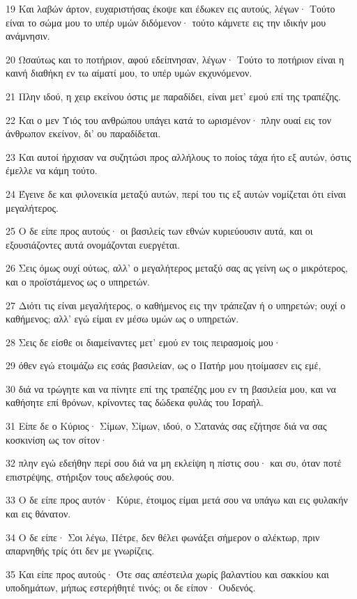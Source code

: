 \par 19 Και λαβών άρτον, ευχαριστήσας έκοψε και έδωκεν εις αυτούς, λέγων· Τούτο είναι το σώμα μου το υπέρ υμών διδόμενον· τούτο κάμνετε εις την ιδικήν μου ανάμνησιν.
\par 20 Ωσαύτως και το ποτήριον, αφού εδείπνησαν, λέγων· Τούτο το ποτήριον είναι η καινή διαθήκη εν τω αίματί μου, το υπέρ υμών εκχυνόμενον.
\par 21 Πλην ιδού, η χειρ εκείνου όστις με παραδίδει, είναι μετ' εμού επί της τραπέζης.
\par 22 Και ο μεν Υιός του ανθρώπου υπάγει κατά το ωρισμένον· πλην ουαί εις τον άνθρωπον εκείνον, δι' ου παραδίδεται.
\par 23 Και αυτοί ήρχισαν να συζητώσι προς αλλήλους το ποίος τάχα ήτο εξ αυτών, όστις έμελλε να κάμη τούτο.
\par 24 Έγεινε δε και φιλονεικία μεταξύ αυτών, περί του τις εξ αυτών νομίζεται ότι είναι μεγαλήτερος.
\par 25 Ο δε είπε προς αυτούς· οι βασιλείς των εθνών κυριεύουσιν αυτά, και οι εξουσιάζοντες αυτά ονομάζονται ευεργέται.
\par 26 Σεις όμως ουχί ούτως, αλλ' ο μεγαλήτερος μεταξύ σας ας γείνη ως ο μικρότερος, και ο προϊστάμενος ως ο υπηρετών.
\par 27 Διότι τις είναι μεγαλήτερος, ο καθήμενος εις την τράπεζαν ή ο υπηρετών; ουχί ο καθήμενος; αλλ' εγώ είμαι εν μέσω υμών ως ο υπηρετών.
\par 28 Σεις δε είσθε οι διαμείναντες μετ' εμού εν τοις πειρασμοίς μου·
\par 29 όθεν εγώ ετοιμάζω εις εσάς βασιλείαν, ως ο Πατήρ μου ητοίμασεν εις εμέ,
\par 30 διά να τρώγητε και να πίνητε επί της τραπέζης μου εν τη βασιλεία μου, και να καθήσητε επί θρόνων, κρίνοντες τας δώδεκα φυλάς του Ισραήλ.
\par 31 Είπε δε ο Κύριος· Σίμων, Σίμων, ιδού, ο Σατανάς σας εζήτησε διά να σας κοσκινίση ως τον σίτον·
\par 32 πλην εγώ εδεήθην περί σου διά να μη εκλείψη η πίστις σου· και συ, όταν ποτέ επιστρέψης, στήριξον τους αδελφούς σου.
\par 33 Ο δε είπε προς αυτόν· Κύριε, έτοιμος είμαι μετά σου να υπάγω και εις φυλακήν και εις θάνατον.
\par 34 Ο δε είπε· Σοι λέγω, Πέτρε, δεν θέλει φωνάξει σήμερον ο αλέκτωρ, πριν απαρνηθής τρίς ότι δεν με γνωρίζεις.
\par 35 Και είπε προς αυτούς· Ότε σας απέστειλα χωρίς βαλαντίου και σακκίου και υποδημάτων, μήπως εστερήθητέ τινός; οι δε είπον· Ουδενός.
